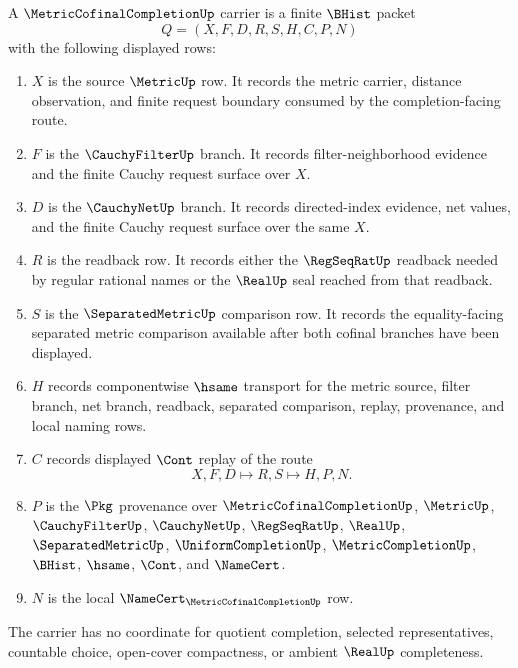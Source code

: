 \begin{definition}
\label{def:metric-cofinal-completion-carrier}
A $\MetricCofinalCompletionUp$ carrier is a finite $\BHist$ packet
$$
Q=(X,F,D,R,S,H,C,P,N)
$$
with the following displayed rows:
\begin{enumerate}
\item $X$ is the source $\MetricUp$ row. It records the metric carrier, distance observation, and finite request boundary consumed by the completion-facing route.
\item $F$ is the $\CauchyFilterUp$ branch. It records filter-neighborhood evidence and the finite Cauchy request surface over $X$.
\item $D$ is the $\CauchyNetUp$ branch. It records directed-index evidence, net values, and the finite Cauchy request surface over the same $X$.
\item $R$ is the readback row. It records either the $\RegSeqRatUp$ readback needed by regular rational names or the $\RealUp$ seal reached from that readback.
\item $S$ is the $\SeparatedMetricUp$ comparison row. It records the equality-facing separated metric comparison available after both cofinal branches have been displayed.
\item $H$ records componentwise $\hsame$ transport for the metric source, filter branch, net branch, readback, separated comparison, replay, provenance, and local naming rows.
\item $C$ records displayed $\Cont$ replay of the route
$$
X,F,D \longmapsto R,S \longmapsto H,P,N .
$$
\item $P$ is the $\Pkg$ provenance over $\MetricCofinalCompletionUp$, $\MetricUp$, $\CauchyFilterUp$, $\CauchyNetUp$, $\RegSeqRatUp$, $\RealUp$, $\SeparatedMetricUp$, $\UniformCompletionUp$, $\MetricCompletionUp$, $\BHist$, $\hsame$, $\Cont$, and $\NameCert$.
\item $N$ is the local $\NameCert_{\MetricCofinalCompletionUp}$ row.
\end{enumerate}
The carrier has no coordinate for quotient completion, selected representatives, countable choice, open-cover compactness, or ambient $\RealUp$ completeness.
\end{definition}

